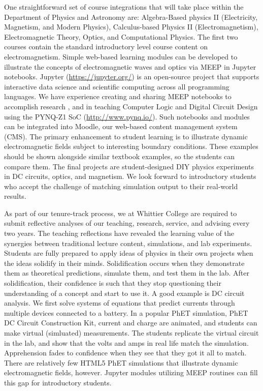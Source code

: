 \documentclass[../../main.tex]{subfiles}
\begin{document}
One straightforward set of course integrations that will take place within the Department of Physics and Astronomy are: Algebra-Based physics II (Electricity, Magnetism, and Modern Physics), Calculus-based Physics II (Electromagnetism), Electromagnetic Theory, Optics, and Computational Physics.  The first two courses contain the standard introductory level course content on electromagnetism.  Simple web-based learning modules can be developed to illustrate the concepts of electromagnetic waves and optics via MEEP in Jupyter notebooks.  Jupyter (\url{https://jupyter.org/}) is an open-source project that supports interactive data science and scientific computing across all programming languages.  We have experience creating and sharing MEEP notebooks to accomplish research \cite{electronics10040415}, and in teaching Computer Logic and Digital Circuit Design using the PYNQ-Z1 SoC (\url{http://www.pynq.io/}). Such notebooks and modules can be integrated into Moodle, our web-based content management system (CMS).  The primary enhancement to student learning is to illustrate dynamic electromagnetic fields subject to interesting boundary conditions.  These examples should be shown alongside similar textbook examples, so the students can compare them.  The final projects are student-designed DIY physics experiments in DC circuits, optics, and magnetism.  We look forward to introductory students who accept the challenge of matching simulation output to their real-world results. \\ \vspace{2.5mm}

As part of our tenure-track process, we at Whittier College are required to submit reflective analyses of our teaching, research, service, and advising every two years.  The teaching reflections have revealed the learning value of the synergies between traditional lecture content, simulations, and lab experiments.  Students are fully prepared to apply ideas of physics in their own projects when the ideas solidify in their minds.  Solidification occurs when they demonstrate them as theoretical predictions, simulate them, and test them in the lab.  After solidification, their confidence is such that they stop questioning their understanding of a concept and start to use it.  A good example is DC circuit analysis.  We first solve systems of equations that predict currents through multiple devices connected to a battery.  In a popular PhET simulation, PhET DC Circuit Construction Kit, current and charge are animated, and students can make virtual (simluated) measurements.  The students replicate the virtual circuit in the lab, and show that the volts and amps in real life match the simulation.  Apprehension fades to confidence when they see that they got it all to match.  There are relatively few HTML5 PhET simulations that illustrate dynamic electromagnetic fields, however.  Jupyter modules utilizing MEEP routines can fill this gap for introductory students. \\ \vspace{2.5mm}
\end{document}
